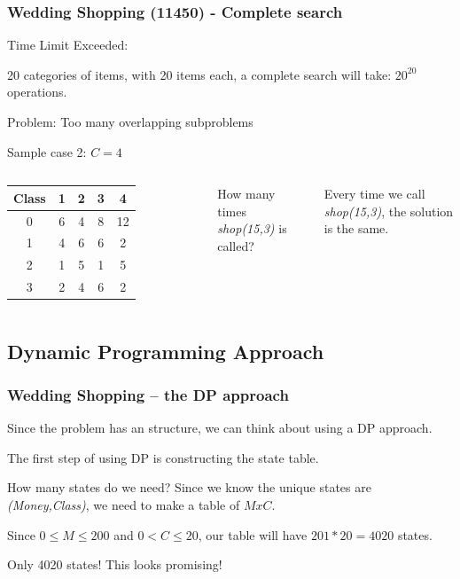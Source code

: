 \documentclass{beamer}
\begin{document}
\begin{frame}
  \frametitle{Wedding Shopping (11450) - Complete search}

  \alert{Time Limit Exceeded:}

  \bigskip

  20 categories of items, with 20 items each, a complete search will
  take: $20^{20}$ operations.

  \vfill

  \alert{Problem: Too many overlapping subproblems}


  \begin{block}{Sample case 2: $C=4$}

    \medskip

    \begin{columns}[T]
      \begin{tabular}{|c|cccc|}
        Class & 1 & 2 & 3 & 4\\
        \hline
        0 & 6 & 4 & 8 & 12\\
        1 & 4 & 6 & 6 & 2\\
        2 & 1 & 5 & 1 & 5\\
        3 & 2 & 4 & 6 & 2\\
      \end{tabular}
      How many times \emph{shop(15,3)} is called?

      \bigskip

      Every time we call \emph{shop(15,3)}, the solution is the same.

    \end{columns}
  \end{block}
\end{frame}

\subsection{Dynamic Programming Approach}

\begin{frame}
  \frametitle{Wedding Shopping -- the DP approach}

  Since the problem has an 
  structure, we can think about using a DP approach.

  \bigskip

  The first step of using DP is constructing the state table.

  \smallskip

  \begin{block}{How many states do we need?}
    Since we know the unique states are \emph{(Money,Class)}, we need
    to make a table of $M x C$.

    \bigskip

    Since $0 \leq M \leq 200$ and $0 < C \leq 20$, our table will have
    \alert{$201*20=4020$ states}.
  \end{block}

  \smallskip

  Only 4020 states! This looks promising!
\end{frame}
\end{document}
